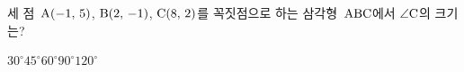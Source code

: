 세 점~$\mathrm{A}(-1,\mkern3mu 5)$, $\mathrm{B}(2,\mkern3mu -1)$, $\mathrm{C}(8,\mkern3mu 2)$를 꼭짓점으로 하는 삼각형~$\mathrm{ABC}$에서 $\angle\mathrm{C}$의 크기는?
\begin{choices32}{$30^\circ$}{$45^\circ$}{$60^\circ$}{$90^\circ$}{$120^\circ$}\end{choices32}
